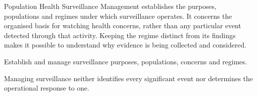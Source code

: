Population Health Surveillance Management establishes the purposes, populations and regimes under which surveillance operates. It concerns the organised basis for watching health concerns, rather than any particular event detected through that activity. Keeping the regime distinct from its findings makes it possible to understand why evidence is being collected and considered.



Establish and manage surveillance purposes, populations, concerns and regimes.



Managing surveillance neither identifies every significant event nor determines the operational response to one.


